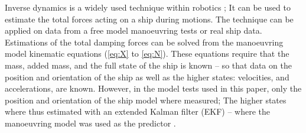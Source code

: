 Inverse dynamics is a widely used technique within robotics \citep{faber_inverse_2018}; It can be used to estimate the total forces acting on a ship during motions. The technique can be applied on data from a free model manoeuvring tests or real ship data. 
Estimations of the total damping forces can be solved from the manoeuvring model kinematic equations  (\autoref{eq:X} to \autoref{eq:N}). These equations require that the mass, added mass, and the full state of the ship is known -- so that data on the position and orientation of the ship as well as the higher states: velocities, and accelerations, are known.
However, in the model tests used in this paper, only the position and orientation of the ship model where measured;
The higher states where thus estimated with an extended Kalman filter (EKF) -- where the manoeuvring model was used as the predictor \citep{alexandersson_wpcc_2022}.

